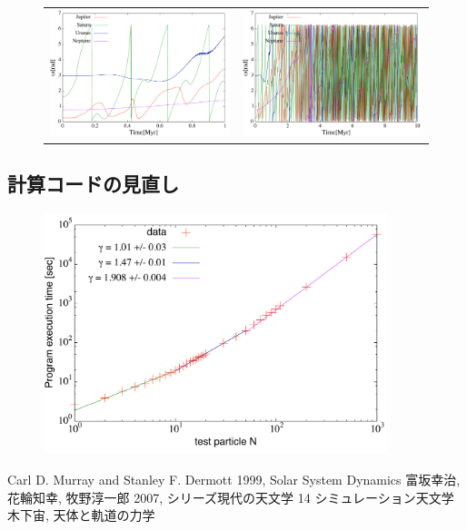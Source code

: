 \documentclass[11pt,a4paper,oneside,onecolumn]{jarticle}
\begin{document}
\begin{figure}[H]
\begin{tabular}{cc}
\begin{minipage}[t]{0.45\hsize}
\centering
\includegraphics[width=7.6cm]{./image/move5Myr_smallomega_1Myr.pdf}
\end{minipage} &
\begin{minipage}[t]{0.45\hsize}
\centering
\includegraphics[width=7.6cm]{./image/move5Myr_smallomega_10Myr.pdf}
\end{minipage}
%
\end{tabular}
\caption{\label{}}
\end{figure}


\subsection{計算コードの見直し}
\begin{figure}[H]
\centering
\includegraphics[width=10cm]{./image/Nbody_test.pdf}
\caption{\label{}}
\end{figure}

\begin{thebibliography}{9}
   Carl D. Murray and Stanley F. Dermott 1999, Solar System Dynamics
   富坂幸治, 花輪知幸, 牧野淳一郎 2007, シリーズ現代の天文学 14 シミュレーション天文学
   木下宙, 天体と軌道の力学
\end{thebibliography}
\end{document}
